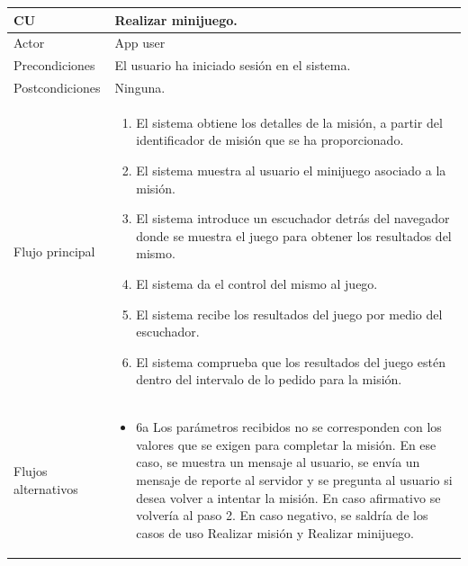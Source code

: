 \documentclass[twoside]{report}
\newcommand\addrow[2]{#1 &#2\\ }
\newcommand\addheading[2]{#1 &#2\\ \hline}
\newcommand\tabularhead{\begin{tabular}{lp{0.7\textwidth}}
\hline
}
\newenvironment{usecase}{\tabularhead}
{\hline\end{tabular}}
\begin{document}
\begin{usecase}
  \addheading{\textbf{CU\arabic{usecase}}}{Realizar minijuego.} 
  \addrow{Actor}{App user}
  \addrow{Precondiciones}{El usuario ha iniciado sesión en el sistema.}
  \addrow{Postcondiciones}{Ninguna.}
  \addrow{Flujo principal}{
  		\begin{enumerate}
  		\item El sistema obtiene los detalles de la misión, a partir del identificador de misión que se ha proporcionado. %
  		\item El sistema muestra al usuario el minijuego asociado a la misión. %
  		\item El sistema introduce un escuchador detrás del navegador donde se muestra el juego para obtener los resultados del mismo. %
  		\item El sistema da el control del mismo al juego. %
  		\item El sistema recibe los resultados del juego por medio del escuchador. %
  		\item El sistema comprueba que los resultados del juego estén dentro del intervalo de lo pedido para la misión. %
  		\end{enumerate}
  }
  \addrow{Flujos alternativos}{
  		\begin{itemize}
  		\item 6a Los parámetros recibidos no se corresponden con los valores que se exigen para completar la misión. En ese caso, se muestra un mensaje al usuario, se envía un mensaje de reporte al servidor y se pregunta al usuario si desea volver a intentar la misión. En caso afirmativo se volvería al paso 2. En caso negativo, se saldría de los casos de uso Realizar misión y Realizar minijuego.
  		\end{itemize}
  }
\end{usecase}\\
\end{document}
